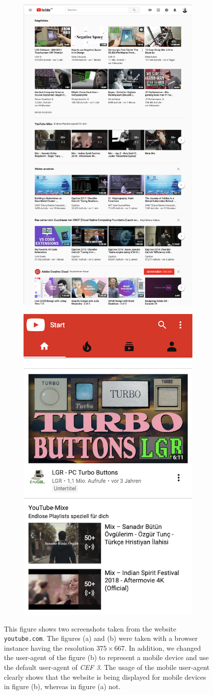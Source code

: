 \begin{figure}
	\centering
	\begin{subfigure}{.6\textwidth}
		\centering
		\includegraphics[width=.5\linewidth]{resources/screenshot_resolution}
		\caption{}
		\label{compare_resolution}
	\end{subfigure}%
	\begin{subfigure}{.6\textwidth}
		\centering
		\includegraphics[width=.5\linewidth]{resources/screenshot_resolutionanduseragent}
		\caption{}
		\label{compare_useragent}
	\end{subfigure}
	\caption{This figure shows two screenshots taken from the website \texttt{youtube.com}. The figures (a) and (b) were taken with a browser instance having the resolution $375 \times 667$. In addition, we changed the user-agent of the figure (b) to represent a mobile device and use the default user-agent of \textit{CEF 3}. The usage of the mobile user-agent clearly shows that the website is being displayed for mobile devices in figure (b), whereas in figure (a) not.}
	\label{compare_resolution_useragent}
\end{figure}

